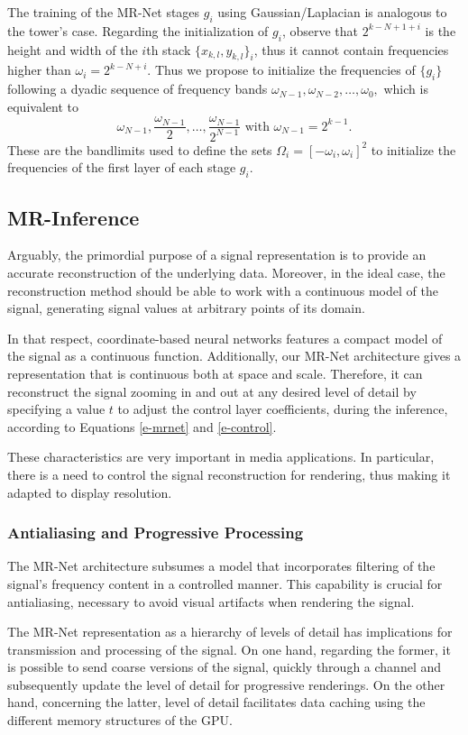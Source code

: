 The training of the MR-Net stages $g_i$ using Gaussian/Laplacian is analogous to the tower's case.
Regarding the initialization of $g_i$, observe that $2^{k-N+1+i}$ is the height and width of the $i$th stack $\{x_{k,l}, y_{k,l}\}_i$, thus it cannot contain frequencies higher than $\omega_i=2^{k-N+i}$. 
Thus we propose to initialize the frequencies of $\{g_i\}$ following a dyadic sequence of frequency bands 
$\omega_{N-1}, \omega_{N-2}, \ldots, \omega_{0},$
which is equivalent to $$\omega_{N-1}, \frac{\omega_{N-1}}{2}, \ldots, \frac{\omega_{N-1}}{2^{N-1}} \text{ with } \omega_{N-1}= 2^{k-1}.$$
These are the bandlimits used to define the sets $\Omega_i=\left[-\omega_i, \omega_i\right]^2$ to initialize the frequencies of the first layer of each stage $g_i$.


\subsection{MR-Inference}

Arguably, the primordial purpose of a signal representation is to provide an accurate reconstruction of the underlying data. Moreover, in the ideal case, the reconstruction method should be able to work with a continuous model of the signal, generating signal values at arbitrary points of its domain.

In that respect, coordinate-based neural networks features a compact model of the signal as a continuous function. Additionally, our MR-Net architecture gives a representation that is continuous both at space and scale. 
Therefore, it can reconstruct the signal zooming in and out at any desired level of detail by specifying a value $t$ to adjust the control layer coefficients, during the inference, according to Equations \ref{e-mrnet} and \ref{e-control}.

These characteristics are very important in media applications. In particular, there is a need to control the signal reconstruction for rendering, thus making it adapted to display resolution.


\subsubsection{Antialiasing and Progressive Processing}

The MR-Net architecture subsumes a model that incorporates filtering of the signal's frequency content in a controlled manner. This capability is crucial for antialiasing, necessary to avoid visual artifacts when rendering the signal.

The MR-Net representation as a hierarchy of levels of detail has implications for transmission and processing of the signal. On one hand, regarding the former, it is possible to send coarse versions of the signal, quickly through a channel and subsequently update the level of detail for progressive renderings. On the other hand, concerning the latter, level of detail facilitates data caching using the different memory structures of the GPU.
